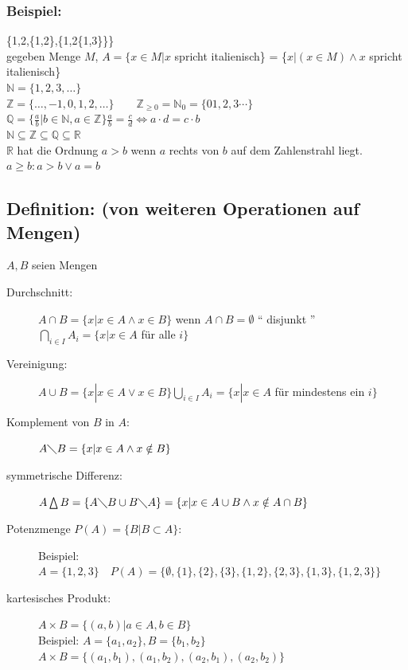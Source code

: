 \subsubsection{Beispiel:}
 \{1,2,\{1,2\},\{1,2\{1,3\}\}\}\\
gegeben Menge $M$, \quad $A=\{x \in M|x$ spricht italienisch\} = \{$x|(x \in M) \wedge x$ spricht italienisch\}\\
$\mathbb{N}=\{1,2,3, \dotsc \}$\\
$\mathbb{Z}=\{\dotsc, -1, 0, 1,2,\dotsc \} \qquad \mathbb{Z}_{\geq 0}=\mathbb{N}_{0}=\{01,2,3\cdots \}$\\
$\mathbb{Q}=\{ \frac{a}{b}|b \in \mathbb{N}, a \in \mathbb{Z}\} \frac{a}{b}=\frac{c}{d} \Leftrightarrow a \cdot d = c \cdot b$\\
$\mathbb{N}\subseteq\mathbb{Z}\subseteq\mathbb{Q}\subseteq\mathbb{R}$\\
$\mathbb{R}$ hat die Ordnung $a>b$ wenn $a$ rechts von $b$ auf dem Zahlenstrahl liegt.\\
$ a \geq b : a >b \vee a=b$\\
%
%
%
\subsection{Definition: (von weiteren Operationen auf Mengen)}

$A,B$ seien Mengen
\begin{description}
	\item[Durchschnitt: ] $A\cap B = \{x|x\in A \wedge x \in B\}$ wenn $A\cap B = 	
		\emptyset$ "` disjunkt "' $\mathop{\bigcap}\limits_{i \in I}A_{i}=\{x|x \in A$ für alle 
		$i\}$
	\item [Vereinigung: ]$A\cup B = \{x|x\in A \vee x \in B\} \mathop{\bigcup}\limits_{i \in I}A_{i}=\{x|x \in A$ für mindestens ein $i\}$
	\item[Komplement von $B$ in $A$:] $A\diagdown B = \{x|x \in A \wedge x \notin 
		B\}$
	\item[symmetrische Differenz: ] $A \bigtriangleup B = \{A \diagdown B \cup B 
		\diagdown  A\} = \{x|x\in A \cup B \wedge x \notin A\cap B\}$
	\item[Potenzmenge $P(A) = \{ B|B\subset A\}$: ] Beispiel: $A = \{1,2,3\} \quad P(A) = 
		\{\emptyset , \{1\},\{2\},\{3\},\{1,2\},\{2,3\},\{1,3\},\{1,2,3\}\}$
	\item[kartesisches Produkt: ] $ A\times B = \{(a,b)|a\in A, b\in B\}$\\
		Beispiel: $A=\{a_{1},a_{2}\}, B=\{b_{1}, b_{2}\}$\\
		$A \times B = \{(a_{1},b_{1}),(a_{1},b_{2}),(a_{2},b_{1}),(a_{2},b_{2})\}$
\end{description}

